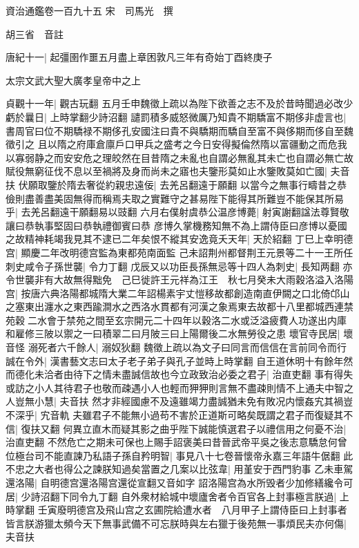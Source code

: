 資治通鑑卷一百九十五
宋　司馬光　撰

胡三省　音註

唐紀十一|{
	起彊圉作噩五月盡上章困敦凡三年有奇始丁酉終庚子}


太宗文武大聖大廣孝皇帝中之上

貞觀十一年|{
	觀古玩翻}
五月壬申魏徵上疏以為陛下欲善之志不及於昔時聞過必改少虧於曩日|{
	上時掌翻少詩沼翻}
譴罰積多威怒微厲乃知貴不期驕富不期侈非虚言也|{
	書周官曰位不期驕禄不期侈孔安國注曰貴不與驕期而驕自至富不與侈期而侈自至魏徵引之}
且以隋之府庫倉廪戶口甲兵之盛考之今日安得擬倫然隋以富疆動之而危我以寡弱静之而安安危之理皎然在目昔隋之未亂也自謂必無亂其未亡也自謂必無亡故賦役無窮征伐不息以至禍將及身而尚未之寤也夫鑒形莫如止水鑒敗莫如亡國|{
	夫音扶}
伏願取鑒於隋去奢從約親忠遠佞|{
	去羌呂翻遠于願翻}
以當今之無事行疇昔之恭儉則盡善盡美固無得而稱焉夫取之實難守之甚易陛下能得其所難豈不能保其所易乎|{
	去羌呂翻遠干願翻易以豉翻}
六月右僕射虞恭公温彦博薨|{
	射寅謝翻諡法尊賢敬讓曰恭執事堅固曰恭執禮御賓曰恭}
彦博久掌機務知無不為上謂侍臣曰彦博以憂國之故精神耗竭我見其不逮已二年矣恨不縱其安逸竟夭天年|{
	天於紹翻}
丁巳上幸明德宫|{
	顯慶二年改明德宫監為東都苑南面監}
己未詔荆州都督荆王元景等二十一王所任刺史咸令子孫世襲|{
	令力丁翻}
戊辰又以功臣長孫無忌等十四人為刺史|{
	長知两翻}
亦令世襲非有大故無得黜免　己巳徙許王元祥為江王　秋七月癸未大雨穀洛溢入洛陽宫|{
	按唐六典洛陽都城隋大業二年詔楊素宇丈愷移故都創造南直伊闕之口北倚邙山之塞東出瀍水之東西踰澗水之西洛水貫都有河漢之象焉東去故都十八里都城西連禁苑穀二水會于禁苑之間至玄宗開元二十四年以穀洛二水或泛溢疲費人功遂出内庫和雇修三陂以禦之一曰積翠二曰月陂三曰上陽爾後二水無勞役之患}
壞官寺民居|{
	壞音怪}
溺死者六千餘人|{
	溺奴狄翻}
魏徵上疏以為文子曰同言而信信在言前同令而行誠在令外|{
	漢書藝文志曰太子老子弟子與孔子並時上時掌翻}
自王道休明十有餘年然而德化未洽者由待下之情未盡誠信故也今立政致治必委之君子|{
	治直吏翻}
事有得失或訪之小人其待君子也敬而疎遇小人也輕而狎狎則言無不盡疎則情不上通夫中智之人豈無小慧|{
	夫音扶}
然才非經國慮不及遠雖竭力盡誠猶未免有敗况内懷姦宄其禍豈不深乎|{
	宄音軌}
夫雖君子不能無小過苟不害於正道斯可略矣既謂之君子而復疑其不信|{
	復扶又翻}
何異立直木而疑其影之曲乎陛下誠能慎選君子以禮信用之何憂不治|{
	治直吏翻}
不然危亡之期未可保也上賜手詔褒美曰昔晉武帝平吳之後志意驕怠何曾位極台司不能直諫乃私語子孫自矜明智|{
	事見八十七卷晉懷帝永嘉三年語牛倨翻}
此不忠之大者也得公之諫朕知過矣當置之几案以比弦韋|{
	用堇安于西門豹事}
乙未車駕還洛陽|{
	自明德宫還洛陽宫還從宣翻又音如字}
詔洛陽宫為水所毁者少加修繕纔令可居|{
	少詩沼翻下同令九丁翻}
自外衆材給城中壞廬舍者令百官各上封事極言朕過|{
	上時掌翻}
壬寅廢明德宫及飛山宫之玄圃院給遭水者　八月甲子上謂侍臣曰上封事者皆言朕游獵太頻今天下無事武備不可忘朕時與左右獵于後苑無一事煩民夫亦何傷|{
	夫音扶}
